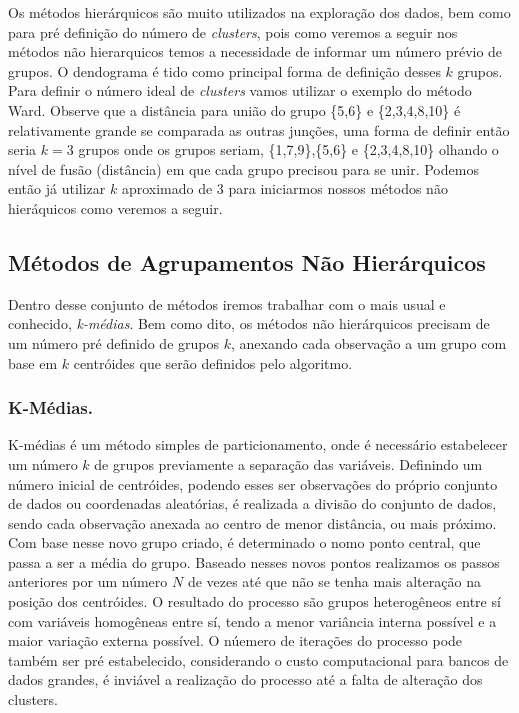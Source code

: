 \documentclass[
  letterpaper,
  DIV=11,
  numbers=noendperiod]{scrreprt}
\begin{document}
Os métodos hierárquicos são muito utilizados na exploração dos dados,
bem como para pré definição do número de \emph{clusters}, pois como
veremos a seguir nos métodos não hierarquicos temos a necessidade de
informar um número prévio de grupos. O dendograma é tido como principal
forma de definição desses \(k\) grupos. Para definir o número ideal de
\emph{clusters} vamos utilizar o exemplo do método Ward. Observe que a
distância para união do grupo \{5,6\} e \{2,3,4,8,10\} é relativamente
grande se comparada as outras junções, uma forma de definir então seria
\(k = 3\) grupos onde os grupos seriam, \{1,7,9\},\{5,6\} e
\{2,3,4,8,10\} olhando o nível de fusão (distância) em que cada grupo
precisou para se unir. Podemos então já utilizar \(k\) aproximado de 3
para iniciarmos nossos métodos não hieráquicos como veremos a seguir.

\hypertarget{muxe9todos-de-agrupamentos-nuxe3o-hieruxe1rquicos}{%
\subsection{Métodos de Agrupamentos Não
Hierárquicos}\label{muxe9todos-de-agrupamentos-nuxe3o-hieruxe1rquicos}}

Dentro desse conjunto de métodos iremos trabalhar com o mais usual e
conhecido, \emph{k-médias}. Bem como dito, os métodos não hierárquicos
precisam de um número pré definido de grupos \(k\), anexando cada
observação a um grupo com base em \(k\) centróides que serão definidos
pelo algoritmo.

\hypertarget{k-muxe9dias.}{%
\subsubsection{K-Médias.}\label{k-muxe9dias.}}

K-médias é um método simples de particionamento, onde é necessário
estabelecer um número \(k\) de grupos previamente a separação das
variáveis. Definindo um número inicial de centróides, podendo esses ser
observações do próprio conjunto de dados ou coordenadas aleatórias, é
realizada a divisão do conjunto de dados, sendo cada observação anexada
ao centro de menor distância, ou mais próximo. Com base nesse novo grupo
criado, é determinado o nomo ponto central, que passa a ser a média do
grupo. Baseado nesses novos pontos realizamos os passos anteriores por
um número \(N\) de vezes até que não se tenha mais alteração na posição
dos centróides. O resultado do processo são grupos heterogêneos entre sí
com variáveis homogêneas entre sí, tendo a menor variância interna
possível e a maior variação externa possível. O núemero de iterações do
processo pode também ser pré estabelecido, considerando o custo
computacional para bancos de dados grandes, é inviável a realização do
processo até a falta de alteração dos clusters.
\end{document}
